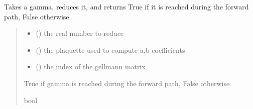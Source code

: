 \documentclass[letterpaper,10pt,english]{sphinxmanual}
\begin{document}
\begin{fulllineitems}
\label{\detokenize{analytical_reject:analytical_reject.gamma_aller_retour}}
\pysigstartsignatures
\pysiglinewithargsret
{}
{\sphinxparamcomma {}\sphinxparamcomma {}}
{}
\pysigstopsignatures
\sphinxAtStartPar
Takes a gamma, reduces it, and returns True if it is reached during the forward path, False otherwise.
\begin{quote}\begin{description}
\begin{itemize}
\item {} 
\sphinxAtStartPar
{} () \textendash{} the real number to reduce

\item {} 
\sphinxAtStartPar
{} () \textendash{} the plaquette used to compute a,b coefficients

\item {} 
\sphinxAtStartPar
{} () \textendash{} the index of the gell\sphinxhyphen{}mann matrix

\end{itemize}

\sphinxAtStartPar
True if gamma is reached during the forward path, False otherwise

\sphinxAtStartPar
bool

\end{description}\end{quote}

\end{fulllineitems}

\end{document}
